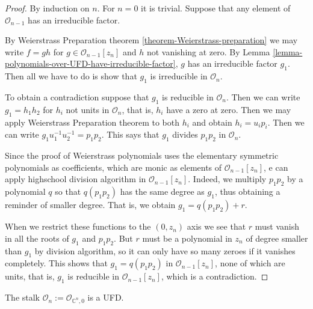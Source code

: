 \begin{proof}
By induction on $n$. For $n=0$ it is trivial. Suppose that any element of
$\mathcal{O}_{n-1}$ has an irreducible factor.

By Weierstrass Preparation theorem \ref{theorem-Weierstrass-preparation} we may
write $f=gh$ for $g\in \mathcal{O}_{n-1}[z_n]$ and $h$ not vanishing at zero. By
Lemma \ref{lemma-polynomials-over-UFD-have-irreducible-factor}, $g$ has an
irreducible factor $g_1$. Then all we have to do is show that $g_1$ is
irreducible in $\mathcal{O}_n$.

To obtain a contradiction suppose that $g_1$ is reducible in
$\mathcal{O}_n$. Then we can write $g_1=h_1h_2$ for $h_i$ not units in
$\mathcal{O}_n$, that is, $h_i$ have a zero at zero. Then we may apply
Weierstrass Preparation theorem to both $h_i$ and obtain $h_i=u_ip_i$. Then we
can write $g_1u_1^{-1}u_2^{-1}=p_1p_2$. This says that $g_1$ divides $p_1p_2$ in
$\mathcal{O}_n$.

Since the proof of Weierstrass polynomials uses the elementary symmetric
polynomials as coefficients, which are monic as elements of
$\mathcal{O}_{n-1}[z_n]$, e can apply highschool division algorithm in
$\mathcal{O}_{n-1}[z_n]$. Indeed, we multiply $p_1p_2$ by a polynomial $q$ so
that $q(p_1p_2)$ has the same degree as $g_1$, thus obtaining a reminder of
smaller degree. That is, we obtain $g_1=q(p_1p_2)+r$.

When we restrict these functions to the $(0,z_n)$ axis we see that $r$ must
vanish in all the roots of $g_1$ and $p_1p_2$. But $r$ must be a polynomial in
$z_n$ of degree smaller than $g_1$ by division algorithm, so it can only have so
many zeroes if it vanishes completely. 
This shows that $g_1=q(p_1p_2)$ in $\mathcal{O}_{n-1}[z_n]$, none of which are
units, that is, $g_1$ is reducible in $\mathcal{O}_{n-1}[z_n]$, which is a
contradiction.
\end{proof}

\begin{lemma}
\label{lemma-stalk-is-UFD}
The stalk $\mathcal{O}_n:=\mathcal{O}_{\mathbb{C}^n,0}$ is a UFD.
\end{lemma}

